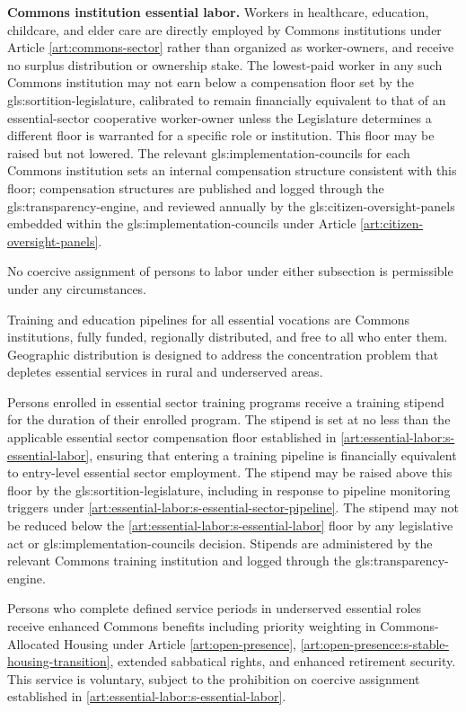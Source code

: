 \textbf{Commons institution essential labor.} Workers in healthcare, education, childcare, and elder care are directly employed by Commons institutions under Article \ref{art:commons-sector} rather than organized as worker-owners, and receive no surplus distribution or ownership stake. The lowest-paid worker in any such Commons institution may not earn below a compensation floor set by the \gls{gls:sortition-legislature}, calibrated to remain financially equivalent to that of an essential-sector cooperative worker-owner unless the Legislature determines a different floor is warranted for a specific role or institution. This floor may be raised but not lowered. The relevant \gls{gls:implementation-councils} for each Commons institution sets an internal compensation structure consistent with this floor; compensation structures are published and logged through the \gls{gls:transparency-engine}, and reviewed annually by the \gls{gls:citizen-oversight-panels} embedded within the \gls{gls:implementation-councils} under Article \ref{art:citizen-oversight-panels}.

No coercive assignment of persons to labor under either subsection is permissible under any circumstances.

Training and education pipelines for all essential vocations are Commons institutions, fully funded, regionally distributed, and free to all who enter them. Geographic distribution is designed to address the concentration problem that depletes essential services in rural and underserved areas.

Persons enrolled in essential sector training programs receive a training stipend for the duration of their enrolled program. The stipend is set at no less than the applicable essential sector compensation floor established in \ref{art:essential-labor:s-essential-labor}, ensuring that entering a training pipeline is financially equivalent to entry-level essential sector employment. The stipend may be raised above this floor by the \gls{gls:sortition-legislature}, including in response to pipeline monitoring triggers under \ref{art:essential-labor:s-essential-sector-pipeline}. The stipend may not be reduced below the \ref{art:essential-labor:s-essential-labor} floor by any legislative act or \gls{gls:implementation-councils} decision. Stipends are administered by the relevant Commons training institution and logged through the \gls{gls:transparency-engine}.

Persons who complete defined service periods in underserved essential roles receive enhanced Commons benefits including priority weighting in Commons-Allocated Housing under Article \ref{art:open-presence}, \ref{art:open-presence:s-stable-housing-transition}, extended sabbatical rights, and enhanced retirement security. This service is voluntary, subject to the prohibition on coercive assignment established in \ref{art:essential-labor:s-essential-labor}.

